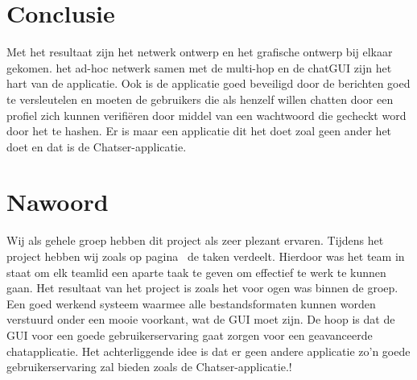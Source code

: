 \documentclass[12pt]{article}
\begin{document}
\section{Conclusie}
Met het resultaat zijn het netwerk ontwerp en het grafische ontwerp bij elkaar gekomen.  het ad-hoc netwerk samen met de multi-hop en de chatGUI zijn het hart van de applicatie.  Ook is de applicatie goed beveiligd door de berichten goed te versleutelen en moeten de gebruikers die als henzelf willen chatten door een profiel zich kunnen verifi\"eren door middel van een wachtwoord die gecheckt word door het te hashen. Er is maar een applicatie dit het doet zoal geen ander het doet en dat is de Chatser-applicatie\small\textcopyright.

\newpage

\section{Nawoord}
Wij als gehele groep hebben dit project als zeer plezant ervaren. Tijdens het project hebben wij zoals op pagina~\pageref{taken} de taken verdeelt. Hierdoor was het team in staat om elk teamlid een aparte taak te geven om effectief te werk te kunnen gaan. Het resultaat van het project is zoals het voor ogen was binnen de groep. Een goed werkend systeem waarmee alle bestandsformaten kunnen  worden verstuurd onder een mooie voorkant, wat de GUI moet zijn. De hoop is dat de GUI voor een goede gebruikerservaring gaat zorgen voor een geavanceerde chatapplicatie. Het achterliggende idee is dat er geen andere applicatie zo'n goede gebruikerservaring zal bieden zoals de Chatser-applicatie\small.\textcopyright!
\end{document}
